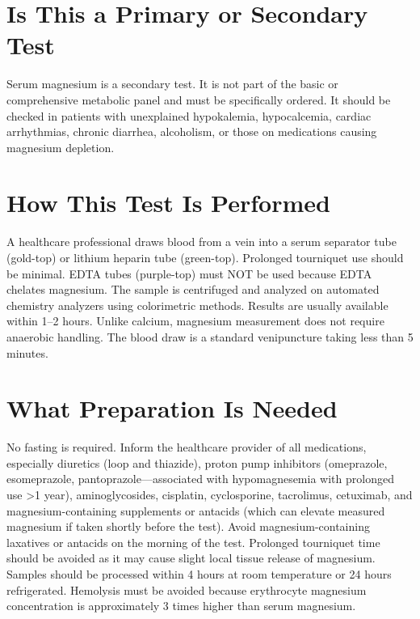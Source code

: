 \section*{Is This a Primary or Secondary Test}
Serum magnesium is a secondary test. It is not part of the basic or comprehensive metabolic panel and must be specifically ordered. It should be checked in patients with unexplained hypokalemia, hypocalcemia, cardiac arrhythmias, chronic diarrhea, alcoholism, or those on medications causing magnesium depletion.

\section*{How This Test Is Performed}
A healthcare professional draws blood from a vein into a serum separator tube (gold-top) or lithium heparin tube (green-top). Prolonged tourniquet use should be minimal. EDTA tubes (purple-top) must NOT be used because EDTA chelates magnesium. The sample is centrifuged and analyzed on automated chemistry analyzers using colorimetric methods. Results are usually available within 1--2 hours. Unlike calcium, magnesium measurement does not require anaerobic handling. The blood draw is a standard venipuncture taking less than 5 minutes.

\section*{What Preparation Is Needed}
No fasting is required. Inform the healthcare provider of all medications, especially diuretics (loop and thiazide), proton pump inhibitors (omeprazole, esomeprazole, pantoprazole---associated with hypomagnesemia with prolonged use >1 year), aminoglycosides, cisplatin, cyclosporine, tacrolimus, cetuximab, and magnesium-containing supplements or antacids (which can elevate measured magnesium if taken shortly before the test). Avoid magnesium-containing laxatives or antacids on the morning of the test. Prolonged tourniquet time should be avoided as it may cause slight local tissue release of magnesium. Samples should be processed within 4 hours at room temperature or 24 hours refrigerated. Hemolysis must be avoided because erythrocyte magnesium concentration is approximately 3 times higher than serum magnesium.

